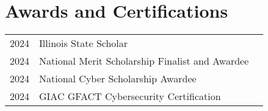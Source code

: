 \documentclass[]{deedy-resume-reversed}
\begin{document}
\begin{minipage}[t]{0.60\textwidth}






	\section{Awards and Certifications}
	\begin{tabular}{rll}
		2024 & Illinois State Scholar                          \\
		2024 & National Merit Scholarship Finalist and Awardee \\
		2024 & National Cyber Scholarship Awardee              \\
		2024 & GIAC GFACT Cybersecurity Certification          \\
	\end{tabular}
	\sectionsep




\end{minipage}
\end{document}
